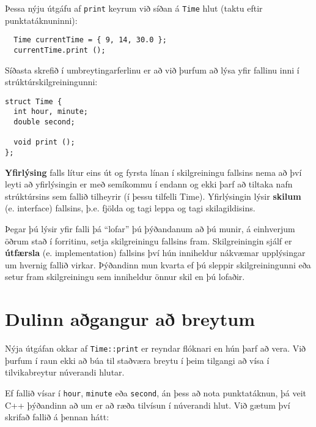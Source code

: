 Þessa nýju útgáfu af {\tt print} keyrum við síðan á {\tt Time} hlut (taktu eftir punktatáknuninni):

\begin{verbatim}
  Time currentTime = { 9, 14, 30.0 };
  currentTime.print ();
\end{verbatim}
%
Síðasta skrefið í umbreytingarferlinu er að við þurfum að lýsa yfir fallinu inni í strúktúrskilgreiningunni:

\begin{verbatim}
struct Time {
  int hour, minute;
  double second;

  void print ();
};
\end{verbatim}
%
{\bf Yfirlýsing} falls lítur eins út og fyrsta línan í skilgreiningu fallsins nema að því leyti að yfirlýsingin er með semíkommu í endann og ekki þarf að tiltaka nafn strúktúrsins sem fallið tilheyrir (í þessu tilfelli Time).
Yfirlýsingin lýsir {\bf skilum} (e. interface) fallsins, þ.e. fjölda og tagi leppa og tagi skilagildisins.

Þegar þú lýsir yfir falli þá ``lofar'' þú þýðandanum að þú munir, á einhverjum öðrum stað í forritinu, setja skilgreiningu fallsins fram.
Skilgreiningin sjálf er {\bf útfærsla} (e. implementation) fallsins því hún inniheldur nákvæmar upplýsingar um hvernig fallið virkar.
Þýðandinn mun kvarta ef þú sleppir skilgreiningunni eða setur fram skilgreiningu sem inniheldur önnur skil en þú lofaðir.

\section {Dulinn aðgangur að breytum}

Nýja útgáfan okkar af {\tt Time::print} er reyndar flóknari en hún þarf að vera.
Við þurfum í raun ekki að búa til staðværa breytu í þeim tilgangi að vísa í tilvikabreytur núverandi hlutar.

Ef fallið vísar í {\tt hour}, {\tt minute} eða {\tt second}, án þess að nota punktatáknun, þá veit C++ þýðandinn að um er að ræða tilvísun í núverandi hlut.
Við gætum því skrifað fallið á þennan hátt: 

\begin{verbatim}
void Time::print ()
{
  cout << hour << ":" << minute << ":" << second << endl;
}
\end{verbatim}
%
Þessi tegund af aðgangi að breytum er kallaður ``dulinn'' (e. implicit) vegna þess að nafn hlutarins er ekki ljóst (e. explicit). 
Þetta er ein ástæða þess að meðlimaföll eru oft samþjappaðri en föll sem eru ekki meðlimaföll.

